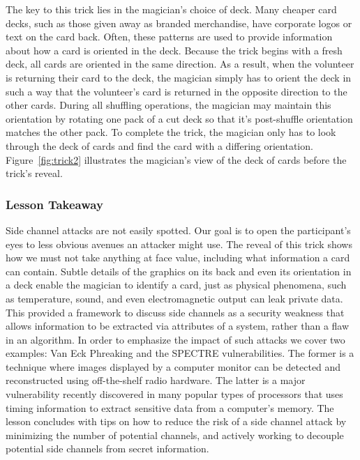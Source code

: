 The key to this trick lies in the magician's choice of deck.  Many cheaper card
decks, such as those given away as branded merchandise,
have corporate logos or
text on the card back.  Often, these patterns are used to
provide information about how a card is oriented in the deck.  Because the trick
begins with a fresh deck, all cards are oriented in the same direction.  As a
result, when the volunteer is returning their card to the deck, the magician
simply has to orient the deck in such a way that the volunteer's card is returned
in the opposite direction to the other cards.  During all shuffling
operations, the magician may maintain this orientation by rotating one pack of a
cut deck so that it's post-shuffle orientation matches the other pack.
To complete the trick, the magician only has to look through the deck of cards
and find the card with a differing orientation.  Figure~\ref{fig:trick2}
illustrates the magician's view of the deck of cards before the trick's
reveal.

%

\subsubsection{Lesson Takeaway}

Side channel attacks are not easily spotted.  Our goal is to
open the participant's eyes to less
obvious avenues an attacker might use.
The reveal of this trick shows how we must not
take anything at face value, including what information
a card can contain.
Subtle details of the graphics on its back and even its orientation in a
deck enable the magician to identify a card, just as physical phenomena,
such as temperature, sound, and even electromagnetic output can
leak private data.
This provided a framework
to discuss side channels
as a security weakness that allows information to
be extracted via attributes
of a system, rather than a flaw in an
algorithm.
In order to emphasize the impact of such attacks we cover two examples: Van
Eck Phreaking and the SPECTRE vulnerabilities.
The former is a technique where images displayed by a computer monitor can be
detected and reconstructed using off-the-shelf radio hardware.
The latter is a major vulnerability recently discovered in many popular
types of
processors that uses timing information to extract sensitive data from a
computer's memory.
The lesson concludes with tips on how to
reduce the risk of a side channel attack
by minimizing the number of potential channels,
and actively working to decouple potential
side channels from secret information.

